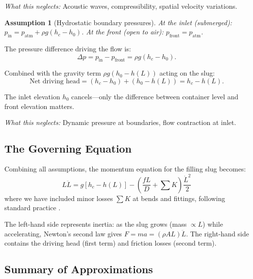 \documentclass[11pt,a4paper]{article}
\newtheorem{assumption}{Assumption}
\theoremstyle{definition}
\begin{document}
\textit{What this neglects:} Acoustic waves, compressibility, spatial velocity variations.

\begin{assumption}[Hydrostatic boundary pressures]
At the inlet (submerged): $p_{\text{in}} = p_{\text{atm}} + \rho g(h_c - h_0)$. At the front (open to air): $p_{\text{front}} = p_{\text{atm}}$.
\end{assumption}

The pressure difference driving the flow is:
\begin{equation}
  \Delta p = p_{\text{in}} - p_{\text{front}} = \rho g(h_c - h_0).
  \label{eq:pressure-diff}
\end{equation}

Combined with the gravity term $\rho g(h_0 - h(L))$ acting on the slug:
\begin{equation}
  \text{Net driving head} = (h_c - h_0) + (h_0 - h(L)) = h_c - h(L).
  \label{eq:driving-head}
\end{equation}

The inlet elevation $h_0$ cancels---only the difference between container level and front elevation matters.

\textit{What this neglects:} Dynamic pressure at boundaries, flow contraction at inlet.

\subsection{The Governing Equation}

Combining all assumptions, the momentum equation for the filling slug becomes:
\begin{equation}
  \boxed{L\ddot{L} = g[h_c - h(L)] - \left(\frac{fL}{D} + \sum K\right)\frac{\dot{L}^2}{2}}
  \label{eq:governing}
\end{equation}
where we have included minor losses $\sum K$ at bends and fittings, following standard practice \citep{idelchik1994handbook}.

The left-hand side represents inertia: as the slug grows (mass $\propto L$) while accelerating, Newton's second law gives $F = ma = (\rho A L)\ddot{L}$. The right-hand side contains the driving head (first term) and friction losses (second term).

\subsection{Summary of Approximations}
\end{document}
